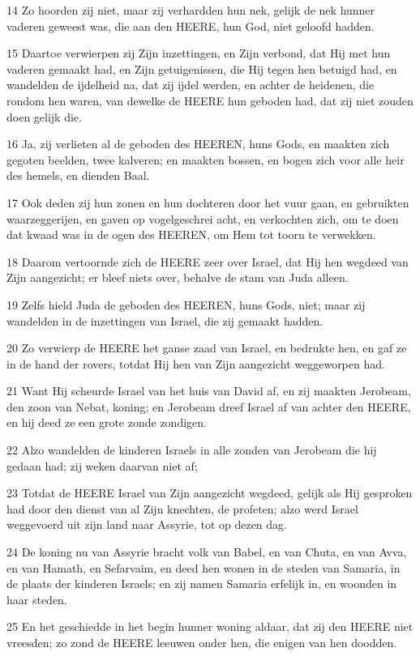 \par 14 Zo hoorden zij niet, maar zij verhardden hun nek, gelijk de nek hunner vaderen geweest was, die aan den HEERE, hun God, niet geloofd hadden.
\par 15 Daartoe verwierpen zij Zijn inzettingen, en Zijn verbond, dat Hij met hun vaderen gemaakt had, en Zijn getuigenissen, die Hij tegen hen betuigd had, en wandelden de ijdelheid na, dat zij ijdel werden, en achter de heidenen, die rondom hen waren, van dewelke de HEERE hun geboden had, dat zij niet zouden doen gelijk die.
\par 16 Ja, zij verlieten al de geboden des HEEREN, huns Gods, en maakten zich gegoten beelden, twee kalveren; en maakten bossen, en bogen zich voor alle heir des hemels, en dienden Baal.
\par 17 Ook deden zij hun zonen en hun dochteren door het vuur gaan, en gebruikten waarzeggerijen, en gaven op vogelgeschrei acht, en verkochten zich, om te doen dat kwaad was in de ogen des HEEREN, om Hem tot toorn te verwekken.
\par 18 Daarom vertoornde zich de HEERE zeer over Israel, dat Hij hen wegdeed van Zijn aangezicht; er bleef niets over, behalve de stam van Juda alleen.
\par 19 Zelfs hield Juda de geboden des HEEREN, huns Gods, niet; maar zij wandelden in de inzettingen van Israel, die zij gemaakt hadden.
\par 20 Zo verwierp de HEERE het ganse zaad van Israel, en bedrukte hen, en gaf ze in de hand der rovers, totdat Hij hen van Zijn aangezicht weggeworpen had.
\par 21 Want Hij scheurde Israel van het huis van David af, en zij maakten Jerobeam, den zoon van Nebat, koning; en Jerobeam dreef Israel af van achter den HEERE, en hij deed ze een grote zonde zondigen.
\par 22 Alzo wandelden de kinderen Israels in alle zonden van Jerobeam die hij gedaan had; zij weken daarvan niet af;
\par 23 Totdat de HEERE Israel van Zijn aangezicht wegdeed, gelijk als Hij gesproken had door den dienst van al Zijn knechten, de profeten; alzo werd Israel weggevoerd uit zijn land naar Assyrie, tot op dezen dag.
\par 24 De koning nu van Assyrie bracht volk van Babel, en van Chuta, en van Avva, en van Hamath, en Sefarvaim, en deed hen wonen in de steden van Samaria, in de plaats der kinderen Israels; en zij namen Samaria erfelijk in, en woonden in haar steden.
\par 25 En het geschiedde in het begin hunner woning aldaar, dat zij den HEERE niet vreesden; zo zond de HEERE leeuwen onder hen, die enigen van hen doodden.
